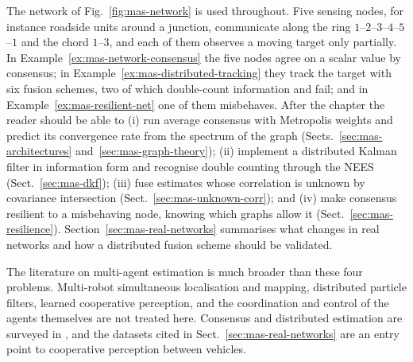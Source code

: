 \documentclass[graybox,envcountchap]{style/SNmono}
\begin{document}
The network of Fig.~\ref{fig:mas-network} is used throughout. Five sensing nodes, for instance roadside units around a junction, communicate along the ring $1$--$2$--$3$--$4$--$5$--$1$ and the chord $1$--$3$, and each of them observes a moving target only partially. In Example~\ref{ex:mas-network-consensus} the five nodes agree on a scalar value by consensus; in Example~\ref{ex:mas-distributed-tracking} they track the target with six fusion schemes, two of which double-count information and fail; and in Example~\ref{ex:mas-resilient-net} one of them misbehaves. After the chapter the reader should be able to (i) run average consensus with Metropolis weights and predict its convergence rate from the spectrum of the graph (Sects.~\ref{sec:mas-architectures} and~\ref{sec:mas-graph-theory}); (ii) implement a distributed Kalman filter in information form and recognise double counting through the NEES (Sect.~\ref{sec:mas-dkf}); (iii) fuse estimates whose correlation is unknown by covariance intersection (Sect.~\ref{sec:mas-unknown-corr}); and (iv) make consensus resilient to a misbehaving node, knowing which graphs allow it (Sect.~\ref{sec:mas-resilience}). Section~\ref{sec:mas-real-networks} summarises what changes in real networks and how a distributed fusion scheme should be validated.

The literature on multi-agent estimation is much broader than these four problems. Multi-robot simultaneous localisation and mapping, distributed particle filters, learned cooperative perception, and the coordination and control of the agents themselves are not treated here. Consensus and distributed estimation are surveyed in \cite{olfatisaber2007_consensus,ren2005_consensus}, and the datasets cited in Sect.~\ref{sec:mas-real-networks} are an entry point to cooperative perception between vehicles.
\end{document}
